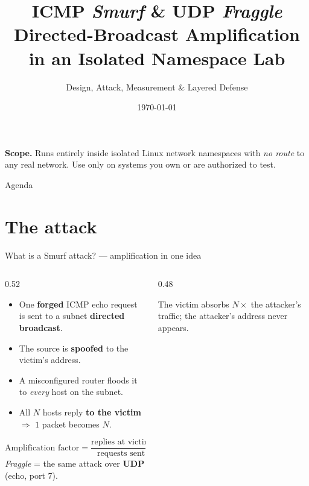 \documentclass[aspectratio=169,10pt]{beamer}
\title[Smurf \& Fraggle Amplification Lab]{ICMP \emph{Smurf} \& UDP \emph{Fraggle}\\[2pt]
       \large Directed-Broadcast Amplification in an Isolated Namespace Lab}
\subtitle{Design, Attack, Measurement \& Layered Defense}
\author{}
\institute{Computer \& Network Security}
\date{\today}
\begin{document}
\begin{frame}[plain]
  \titlepage
  \begin{center}\scriptsize
    \textcolor{attc}{\textbf{Scope.}} Runs entirely inside isolated Linux network
    namespaces with \emph{no route} to any real network. Use only on systems you
    own or are authorized to test.
  \end{center}
\end{frame}

\begin{frame}{Agenda}
  \tableofcontents
\end{frame}

\section{The attack}
\begin{frame}{What is a Smurf attack? — amplification in one idea}
  \begin{columns}[T]
    \begin{column}{0.52\textwidth}
      \begin{itemize}\small
        \item One \textbf{forged} ICMP echo request is sent to a subnet
              \textbf{directed broadcast}.
        \item The source is \textbf{spoofed} to the victim's address.
        \item A misconfigured router floods it to \emph{every} host on the subnet.
        \item All $N$ hosts reply \textbf{to the victim} $\Rightarrow$
              $1$ packet becomes $N$.
      \end{itemize}
      \[
        \text{Amplification factor}=\frac{\text{replies at victim}}{\text{requests sent}}=N
      \]
      \footnotesize \emph{Fraggle} = the same attack over \textbf{UDP} (echo, port 7).
    \end{column}
    \begin{column}{0.48\textwidth}
      \centering
      \vspace{4pt}
      \footnotesize The victim absorbs $N\times$ the attacker's traffic; the
      attacker's address never appears.
    \end{column}
  \end{columns}
\end{frame}
\end{document}
